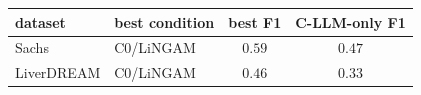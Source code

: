 \begin{tabular}{llcc}
\hline
dataset & best condition & best F1 & C-LLM-only F1 \\
\hline
Sachs & C0/LiNGAM & $0.59$ & $0.47$ \\
LiverDREAM & C0/LiNGAM & $0.46$ & $0.33$ \\
\hline
\end{tabular}
